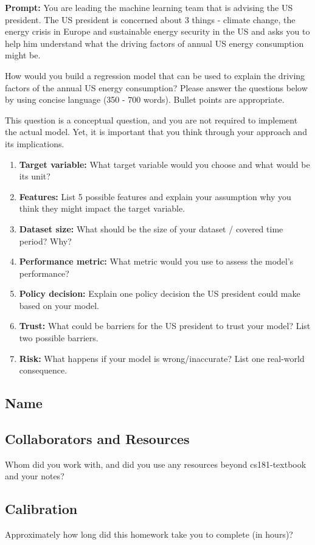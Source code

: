 \documentclass[submit]{harvardml}
\begin{document}
\begin{problem}


\textbf{Prompt:} You are leading the machine learning team that is advising the US president. The US president is concerned about 3 things - climate change, the energy crisis in Europe and sustainable energy security in the US and asks you to help him understand what the driving factors of annual US energy consumption might be.  


How would you build a regression model that can be used to explain the driving factors of the annual US energy consumption? Please answer the questions below by using concise language (350 - 700 words). Bullet points are appropriate. 


This question is a conceptual question, and you are not required to implement the actual model. Yet, it is important that you think through your approach and its implications. 


\begin{enumerate}

\item \textbf{Target variable:} What target variable would you choose and what would be its unit? 
\item \textbf{Features:}  List 5 possible features and explain your assumption why you think they might impact the target variable. 
\item \textbf{Dataset size:} What should be the size of your dataset / covered time period? Why? 
\item \textbf{Performance metric:} What metric would you use to assess the model’s performance? 
\item \textbf{Policy decision:} Explain one policy decision the US president could make based on your model. 
\item \textbf{Trust:} What could be barriers for the US president to trust your model?  List two possible barriers. 
\item \textbf{Risk:} What happens if your model is wrong/inaccurate?  List one real-world consequence. 


\end{enumerate}

\end{problem}

\newpage
\subsection*{Name}

\subsection*{Collaborators and Resources}
Whom did you work with, and did you use any resources beyond cs181-textbook and your notes?

\subsection*{Calibration}
Approximately how long did this homework take you to complete (in hours)? 
\end{document}
